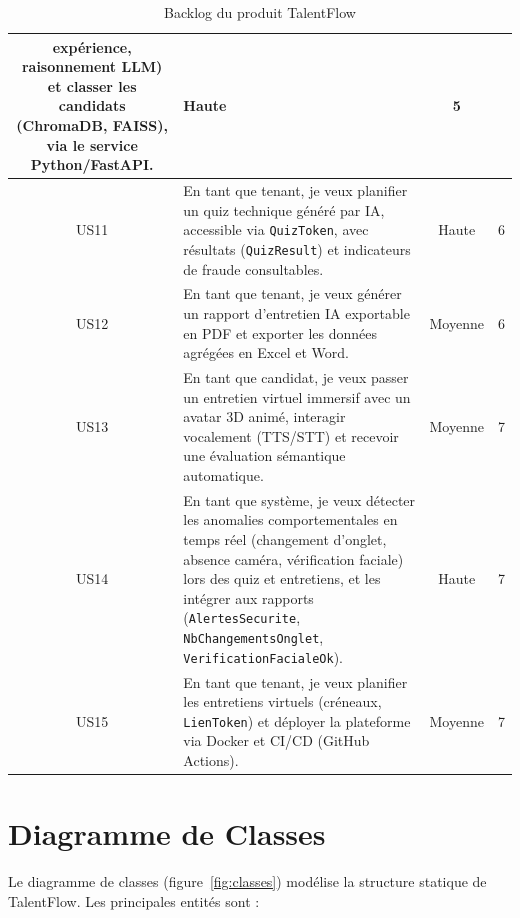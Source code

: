 \begin{table}[h]
\begin{tabular}{|c|p{8.5cm}|c|c|}
expérience, raisonnement LLM) et classer les candidats (ChromaDB, FAISS), via le service
Python/FastAPI. & Haute & 5 \\
\hline
US11 & En tant que tenant, je veux planifier un quiz technique généré par IA, accessible
via \texttt{QuizToken}, avec résultats (\texttt{QuizResult}) et indicateurs de fraude
consultables. & Haute & 6 \\
\hline
US12 & En tant que tenant, je veux générer un rapport d'entretien IA exportable en PDF et
exporter les données agrégées en Excel et Word. & Moyenne & 6 \\
\hline
US13 & En tant que candidat, je veux passer un entretien virtuel immersif avec un avatar
3D animé, interagir vocalement (TTS/STT) et recevoir une évaluation sémantique automatique. & Moyenne & 7 \\
\hline
US14 & En tant que système, je veux détecter les anomalies comportementales en temps réel
(changement d'onglet, absence caméra, vérification faciale) lors des quiz
et entretiens, et les intégrer aux rapports (\texttt{AlertesSecurite},
\texttt{NbChangementsOnglet}, \texttt{VerificationFacialeOk}). & Haute & 7 \\
\hline
US15 & En tant que tenant, je veux planifier les entretiens virtuels (créneaux,
\texttt{LienToken}) et déployer la plateforme via Docker et CI/CD (GitHub Actions). & Moyenne & 7 \\
\hline
\end{tabular}
\caption{Backlog du produit TalentFlow}
\label{tab:backlog}
\end{table}

\section{Diagramme de Classes}

Le diagramme de classes (figure~\ref{fig:classes}) modélise la structure statique de
TalentFlow. Les principales entités sont :

